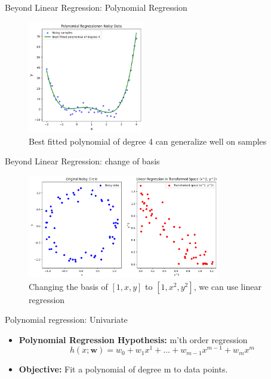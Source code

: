 \documentclass[serif, aspectratio=169]{beamer}
\begin{document}
\begin{frame}{Beyond Linear Regression: Polynomial Regression}
    \begin{figure}[h]
        \centering
        \includegraphics[width=0.45\textwidth]{pic/Polynomial_regression/best_fitted_polynomial.png}
        \caption{Best fitted polynomial of degree 4 can generalize well on samples}
    \end{figure}
\end{frame}


\begin{frame}{Beyond Linear Regression: change of basis}
    \begin{figure}[h]
    \centering
    \includegraphics[width=0.75\textwidth]{pic/Polynomial_regression/change_of_basis.png}
    \caption{Changing the basis of \( [1, x, y] \) to \( [1, x^2, y^2] \), we can use linear regression}
    \end{figure}
\end{frame}

\begin{frame}{Polynomial regression: Univariate}
    \begin{itemize}
        \item \textbf{Polynomial Regression Hypothesis:} m'th order regression
        \[
        h(x; \mathbf{w}) = w_0 + w_1 x^1 + \dots + w_{m-1} x^{m-1} + w_m x^m
        \]
        \item \textbf{Objective:} Fit a polynomial of degree m to data points.
    \end{itemize}
\end{frame}
\end{document}
